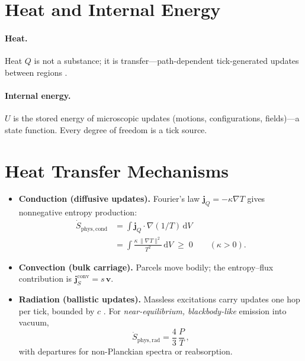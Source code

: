 \section*{Heat and Internal Energy}

\paragraph{Heat.}
Heat \(Q\) is not a substance; it is transfer—path-dependent tick-generated updates between regions \cite{callen1985thermodynamics}.

\paragraph{Internal energy.}
\(U\) is the stored energy of microscopic updates (motions, configurations, fields)—a state function. Every degree of freedom is a tick source.

\section*{Heat Transfer Mechanisms}

\begin{itemize}
  \item \textbf{Conduction (diffusive updates).}
  Fourier’s law \(\mathbf{j}_Q=-\kappa\nabla T\) gives nonnegative entropy production:
  \begin{equation}
  \begin{aligned}
  \dot{S}_{\mathrm{phys,cond}}
    &= \int \mathbf{j}_Q \!\cdot \nabla(1/T)\,\mathrm{d}V \\
    &= \int \frac{\kappa\,\lVert\nabla T\rVert^2}{T^2}\,\mathrm{d}V
       \;\ge\; 0 \qquad (\kappa>0).
  \end{aligned}
  \end{equation}

  \item \textbf{Convection (bulk carriage).}
  Parcels move bodily; the entropy–flux contribution is
  \( \mathbf{j}_S^{\mathrm{conv}} = s\,\mathbf{v} \).

  \item \textbf{Radiation (ballistic updates).}
  Massless excitations carry updates one hop per tick, bounded by \(c\) \cite{einstein1905elektrodynamik,planck1901law}.
  For \emph{near-equilibrium, blackbody-like} emission into vacuum,
  \[
    \dot{S}_{\mathrm{phys,rad}}=\frac{4}{3}\,\frac{P}{T}\,,
  \]
  with departures for non-Planckian spectra or reabsorption.
\end{itemize}


